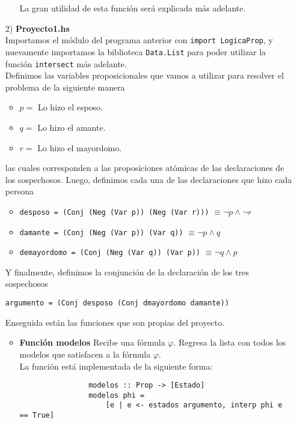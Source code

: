 \documentclass[letterpaper,12pt]{article}
\begin{document}
\begin{itemize}
\begin{itemize}
            La gran utilidad de esta función será explicada más adelante.
        \end{itemize}

        \item[2)] \textbf{Proyecto1.hs} \\
        Importamos el módulo del programa anterior con 
        \texttt{import LogicaProp}, y nuevamente importamos la biblioteca 
        \texttt{Data.List} para poder utilizar la función \texttt{intersect}
        más adelante. \\
        Definimos las variables proposicionales que vamos a utilizar para 
        resolver el problema de la siguiente manera
    
        \begin{itemize}
            \item $p =$ Lo hizo el esposo.
            \item $q =$ Lo hizo el amante.
            \item $r =$ Lo hizo el mayordomo.
        \end{itemize}

        las cuales corresponden a las proposiciones atómicas de las 
        declaraciones de los sospechosos. Luego, definimos cada una de las 
        declaraciones que hizo cada persona

        \begin{itemize}
            \item \texttt{desposo = (Conj (Neg (Var p)) (Neg (Var r)))}
            $\equiv \neg p \land \neg r$
            \item \texttt{damante = (Conj (Neg (Var p)) (Var q))}
            $\equiv \neg p \land q$
            \item \texttt{demayordomo = (Conj (Neg (Var q)) (Var p))}
            $\equiv \neg q \land p$
        \end{itemize}

        Y finalmente, definimos la conjunción de la declaración de los tres 
        sospechosos
        \begin{center}
            \texttt{argumento = (Conj desposo (Conj dmayordomo damante))}
        \end{center}

        Enseguida están las funciones que son propias del proyecto.

        \begin{itemize}
            \item \textbf{Función modelos} Recibe una fórmula $\varphi$. 
            Regresa la lista con todos los modelos que satisfacen a la 
            fórmula $\varphi$. \\
            La función está implementada de la siguiente forma:
            \begin{lstlisting}
                modelos :: Prop -> [Estado]
                modelos phi = 
                    [e | e <- estados argumento, interp phi e == True]
            \end{lstlisting}
            

\end{itemize}
\end{itemize}
\end{document}
